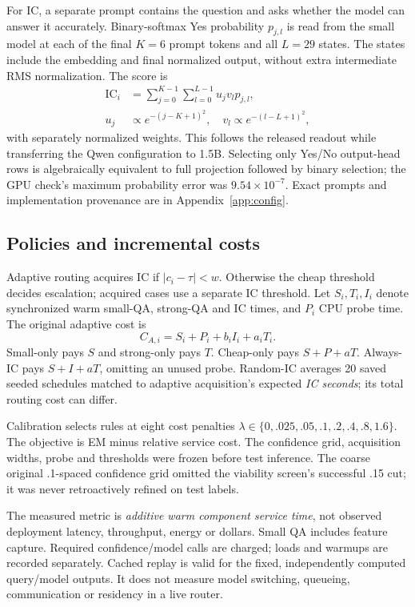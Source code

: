 \documentclass[11pt]{article}
\newcommand{\IC}{\operatorname{IC}}
\begin{document}
For IC, a separate prompt contains the question and asks whether the model can answer it accurately. Binary-softmax Yes probability $p_{j,l}$ is read from the small model at each of the final $K=6$ prompt tokens and all $L=29$ states. The states include the embedding and final normalized output, without extra intermediate RMS normalization. The score is
\begin{align}
\IC_i &= \sum_{j=0}^{K-1}\sum_{l=0}^{L-1}u_jv_l p_{j,l},\\
u_j&\propto e^{-(j-K+1)^2},\quad
v_l\propto e^{-(l-L+1)^2},
\end{align}
with separately normalized weights. This follows the released readout while transferring the Qwen configuration to 1.5B. Selecting only Yes/No output-head rows is algebraically equivalent to full projection followed by binary selection; the GPU check's maximum probability error was $9.54\times10^{-7}$. Exact prompts and implementation provenance are in Appendix~\ref{app:config}.

\subsection{Policies and incremental costs}
Adaptive routing acquires IC if $|c_i-\tau|<w$. Otherwise the cheap threshold decides escalation; acquired cases use a separate IC threshold. Let $S_i,T_i,I_i$ denote synchronized warm small-QA, strong-QA and IC times, and $P_i$ CPU probe time. The original adaptive cost is
\begin{equation}
C_{A,i}=S_i+P_i+b_iI_i+a_iT_i.
\label{eq:cascade}
\end{equation}
Small-only pays $S$ and strong-only pays $T$. Cheap-only pays $S+P+aT$. Always-IC pays $S+I+aT$, omitting an unused probe. Random-IC averages 20 saved seeded schedules matched to adaptive acquisition's expected \emph{IC seconds}; its total routing cost can differ.

Calibration selects rules at eight cost penalties $\lambda\in\{0,.025,.05,.1,.2,.4,.8,1.6\}$. The objective is EM minus relative service cost. The confidence grid, acquisition widths, probe and thresholds were frozen before test inference. The coarse original .1-spaced confidence grid omitted the viability screen's successful .15 cut; it was never retroactively refined on test labels.

The measured metric is \emph{additive warm component service time}, not observed deployment latency, throughput, energy or dollars. Small QA includes feature capture. Required confidence/model calls are charged; loads and warmups are recorded separately. Cached replay is valid for the fixed, independently computed query/model outputs. It does not measure model switching, queueing, communication or residency in a live router.
\end{document}
